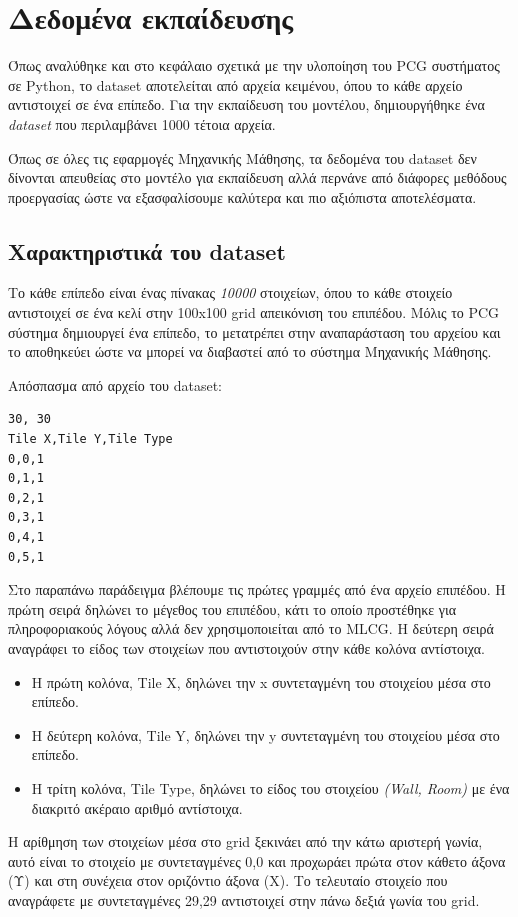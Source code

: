 \section{Δεδομένα εκπαίδευσης}
Όπως αναλύθηκε και στο κεφάλαιο σχετικά με την υλοποίηση του PCG συστήματος σε Python, το dataset αποτελείται από αρχεία κειμένου, όπου το κάθε αρχείο αντιστοιχεί σε ένα επίπεδο. Για την εκπαίδευση του μοντέλου, δημιουργήθηκε ένα \textit{dataset} που περιλαμβάνει 1000 τέτοια αρχεία.
\par
Όπως σε όλες τις εφαρμογές Μηχανικής Μάθησης, τα δεδομένα του dataset δεν δίνονται απευθείας στο μοντέλο για εκπαίδευση αλλά περνάνε από διάφορες μεθόδους προεργασίας ώστε να εξασφαλίσουμε καλύτερα και πιο αξιόπιστα αποτελέσματα.


\subsection{Χαρακτηριστικά του dataset}
Το κάθε επίπεδο είναι ένας πίνακας \textit{10000} στοιχείων, όπου το κάθε στοιχείο αντιστοιχεί σε ένα κελί στην 100x100 grid απεικόνιση του επιπέδου. Μόλις το PCG σύστημα δημιουργεί ένα επίπεδο, το μετατρέπει στην αναπαράσταση του αρχείου και το αποθηκεύει ώστε να μπορεί να διαβαστεί από το σύστημα Μηχανικής Μάθησης.
\par
Απόσπασμα από αρχείο του dataset:
\begin{verbatim}
30, 30
Tile X,Tile Y,Tile Type
0,0,1
0,1,1
0,2,1
0,3,1
0,4,1
0,5,1
\end{verbatim}
Στο παραπάνω παράδειγμα βλέπουμε τις πρώτες γραμμές από ένα αρχείο επιπέδου. Η πρώτη σειρά δηλώνει το μέγεθος του επιπέδου, κάτι το οποίο προστέθηκε για πληροφοριακούς λόγους αλλά δεν χρησιμοποιείται από το MLCG. Η δεύτερη σειρά αναγράφει το είδος των στοιχείων που αντιστοιχούν στην κάθε κολόνα αντίστοιχα.
\par

\begin{itemize}
\item Η πρώτη κολόνα, Tile X, δηλώνει την x συντεταγμένη του στοιχείου μέσα στο επίπεδο.
\item Η δεύτερη κολόνα, Tile Y, δηλώνει την y συντεταγμένη του στοιχείου μέσα στο επίπεδο.
\item Η τρίτη κολόνα, Tile Type, δηλώνει το είδος του στοιχείου \textit{(Wall, Room)} με ένα διακριτό ακέραιο αριθμό αντίστοιχα.
\end{itemize}

\par
H αρίθμηση των στοιχείων μέσα στο grid ξεκινάει από την κάτω αριστερή γωνία, αυτό είναι το στοιχείο με συντεταγμένες 0,0 και προχωράει πρώτα στον κάθετο άξονα (Υ) και στη συνέχεια στον οριζόντιο άξονα (Χ). Το τελευταίο στοιχείο που αναγράφετε με συντεταγμένες 29,29 αντιστοιχεί στην πάνω δεξιά γωνία του grid.

